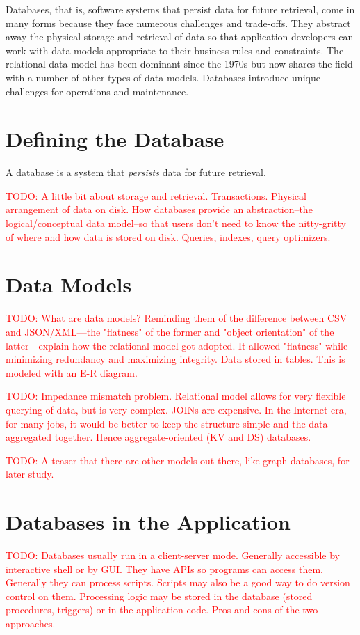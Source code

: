 \documentclass[11pt]{book}
\newcommand{\term}[1]{\emph{#1}} %
\newcommand{\todo}[1]{\textcolor{red}{TODO: #1}} %
\begin{document}
Databases, that is, software systems that persist data for future retrieval, come in many forms because they face numerous challenges and trade-offs.  They abstract away the physical storage and retrieval of data so that application developers can work with data models appropriate to their business rules and constraints.  The relational data model has been dominant since the 1970s but now shares the field with a number of other types of data models.  Databases introduce unique challenges for operations and maintenance.

\section{Defining the Database}
A database is a system that \term{persists} data for future retrieval.  


\todo{A little bit about storage and retrieval.  Transactions.  Physical arrangement of data on disk.  How databases provide an abstraction--the logical/conceptual data model--so that users don't need to know the nitty-gritty of where and how data is stored on disk.  Queries, indexes, query optimizers.}

\section{Data Models}
\todo{What are data models?  Reminding them of the difference between CSV and JSON/XML---the "flatness" of the former and "object orientation" of the latter---explain how the relational model got adopted.  It allowed "flatness" while minimizing redundancy and maximizing integrity.  Data stored in tables.  This is modeled with an E-R diagram.}

\todo{Impedance mismatch problem.  Relational model allows for very flexible querying of data, but is very complex.  JOINs are expensive.  In the Internet era, for many jobs, it would be better to keep the structure simple and the data aggregated together.  Hence aggregate-oriented (KV and DS) databases.}

\todo{A teaser that there are other models out there, like graph databases, for later study.}

\section{Databases in the Application}

\todo{Databases usually run in a client-server mode.  Generally accessible by interactive shell or by GUI.  They have APIs so programs can access them.  Generally they can process scripts.  Scripts may also be a good way to do version control on them.  Processing logic may be stored in the database (stored procedures, triggers) or in the application code.  Pros and cons of the two approaches.}
\end{document}
